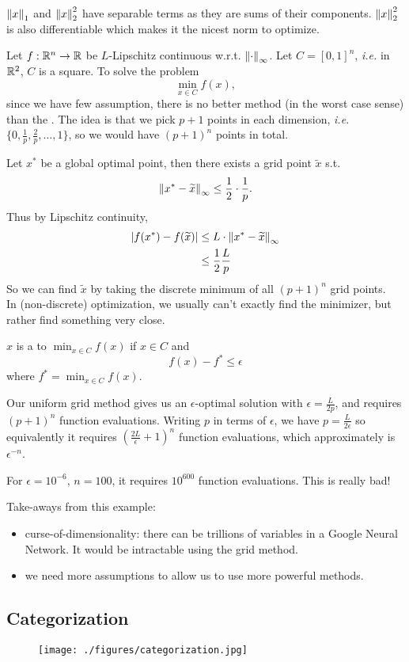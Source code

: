\documentclass[class=article,crop=false]{standalone}
\begin{document}
\begin{remark}
$ {\left\lVert{x}\right\rVert}_1 $ and $ {\left\lVert{x}\right\rVert}_2^2 $ have separable terms as they are sums of their components. $ {\left\lVert{x}\right\rVert}_2^2 $ is also differentiable which makes it the nicest norm to optimize.
\end{remark}

\begin{eg}
	Let $ f: \mathbb{R}^{n} \to \mathbb{R}$ be $ L$-Lipschitz continuous w.r.t.  $ {\left\lVert{ \cdot }\right\rVert}_{\infty} $. Let $ C = [0,1]^{n}$, \emph{i.e.} in $ \mathbb{R}^{2}$, $ C$ is a square. To solve the problem
	\[
		\min_{x \in C} f(x)
	,\]
	since we have few assumption, there is no better method (in the worst case sense) than the . The idea is that we pick $ p+1$ points in each dimension,  \emph{i.e.} $ \{0,\frac{1}{p},\frac{2}{p},\ldots,1\} $, so we would have $ (p+1)^{n}$ points in total.

	Let $ x^* $ be a global optimal point, then there exists a grid point $ \widetilde{ x}$ s.t.  \[
	{\left\lVert{ x^* -\widetilde{ x}}\right\rVert}_{\infty} \leq \frac{1}{2} \cdot  \frac{1}{p} 
	.\]
	Thus by Lipschitz continuity, 
	\begin{align*}
		|f(x^* ) - f(\widetilde{ x})| &\leq L \cdot {\left\lVert{ x^* -\widetilde{ x}}\right\rVert}_{\infty} \\
		&\leq \frac{1}{2} \frac{L}{p}
	\end{align*} 
	So we can find $ \widetilde{ x}$ by taking the discrete minimum of all $ (p+1)^{n}$ grid points.\\

	In (non-discrete) optimization, we usually can't exactly find the minimizer, but rather find something very close.

\begin{defn}
	$ x$ is a   to $ \min_{x \in C} f(x)$ if $ x \in C$ and
	\[
		f(x)-f^*  \leq \epsilon
	\]
	where $ f^* = \min_{x \in C} f(x)$.
\end{defn}

Our uniform grid method gives us an $ \epsilon$-optimal solution with $ \epsilon = \frac{L}{2p}$, and requires $ (p+1)^{n}$ function evaluations. Writing $ p$ in terms of  $ \epsilon$, we have $ p=\frac{L}{2 \epsilon}$ so equivalently it requires $ \left( \frac{2L}{ \epsilon} + 1 \right)^{n} $ function evaluations, which approximately is $ \epsilon^{-n}$. 

For $ \epsilon = 10^{-6}$, $ n=100$, it requires  $ 10^{600}$ function evaluations. This is really bad!

Take-aways from this example:
\begin{itemize}
	\item curse-of-dimensionality: there can be trillions of variables in a Google Neural Network. It would be intractable using the grid method.
	\item we need more assumptions to allow us to use more powerful methods.
\end{itemize}
\end{eg}

\subsection{Categorization}
\begin{figure}[H]
	\hspace*{-4cm}
	\texttt{[image: ./figures/categorization.jpg]}
\end{figure}
\newpage
\end{document}
